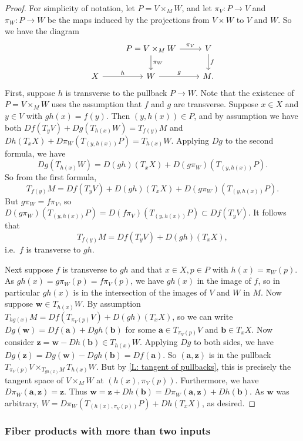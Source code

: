 \begin{proof}
	For simplicity of notation, let $P = V \times_MW$, and let $\pi_V \colon P \to V$ and $\pi_W \colon P \to W$ be the maps induced by the projections from $V \times W$ to $V$ and $W$.
	So we have the diagram
	\[
	\begin{tikzcd}
		& P = V \times_M W \arrow[r, "\pi_V"] \arrow[d, "\pi_W"] & V \arrow[d, "f"] \\
		X \arrow[r, "h"] & W \arrow[r, "g"]&  M.
	\end{tikzcd}
	\]
	First, suppose $h$ is transverse to the pullback $P \to W$.
	Note that the existence of $P = V \times_M W$ uses the assumption that $f$ and $g$ are transverse.
	Suppose $x \in X$ and $y \in V$ with $gh(x) = f(y)$.
	Then $(y,h(x)) \in P$, and by assumption we have both $Df(T_yV)+Dg(T_{h(x)}W) = T_{f(y)}M$ and
	$Dh(T_xX)+D\pi_W(T_{(y,h(x))}P) = T_{h(x)}W$.
	Applying $Dg$ to the second formula, we have
	$$Dg(T_{h(x)}W) = D(gh)(T_xX)+D(g\pi_W)(T_{(y,h(x))}P).$$
	So from the first formula,
	$$T_{f(y)}M = Df(T_yV)+D(gh)(T_xX)+D(g\pi_W)(T_{(y,h(x))}P).$$
	But $g\pi_W = f\pi_V$, so $D(g\pi_W)(T_{(y,h(x))}P) = D(f\pi_V)(T_{(y,h(x))}P) \subset Df(T_yV)$.
	It follows that
	$$T_{f(y)}M = Df(T_yV)+D(gh)(T_xX),$$
	i.e.\ $f$ is transverse to $gh$.

	Next suppose $f$ is transverse to $gh$ and that $x \in X, p \in P$ with $h(x) = \pi_W(p)$.
	As $gh(x) = g\pi_W(p) = f\pi_V(p)$, we have $gh(x)$ in the image of $f$, so in particular $gh(x)$ is in the intersection of the images of $V$ and $W$ in $M$.
	Now suppose $\mathbf w \in T_{h(x)}W$.
	By assumption $T_{hg(x)}M = Df(T_{\pi_V(p)}V)+D(gh)(T_xX)$, so we can write $Dg(\mathbf w) = Df(\mathbf a)+Dgh(\mathbf b)$ for some $\mathbf a \in T_{\pi_V(p)}V$ and $\mathbf b \in T_x X$.
	Now consider $\mathbf z = \mathbf w-Dh(\mathbf b) \in T_{h(x)}W$.
	Applying $Dg$ to both sides, we have $Dg(\mathbf z) = Dg(\mathbf w)-Dgh(\mathbf b) = Df(\mathbf a)$.
	So $(\mathbf a,\mathbf z)$ is in the pullback $T_{\pi_V(p)}V \times_{T_{gh(x)}M} T_{h(x)}W$.
	But by \cref{L: tangent of pullbacks}, this is precisely the tangent space of $V \times_MW$ at $(h(x),\pi_V(p))$.
	Furthermore, we have $D\pi_W(\mathbf a,\mathbf z) = \mathbf z$.
	Thus $\mathbf w = \mathbf z+Dh(\mathbf b) = D\pi_W(\mathbf a,\mathbf z)+Dh(\mathbf b)$.
	As $\mathbf w$ was arbitrary, $W = D\pi_W(T_{(h(x),\pi_V(p))}P)+Dh(T_xX)$, as desired.
\end{proof}

\subsubsection{Fiber products with more than two inputs}

